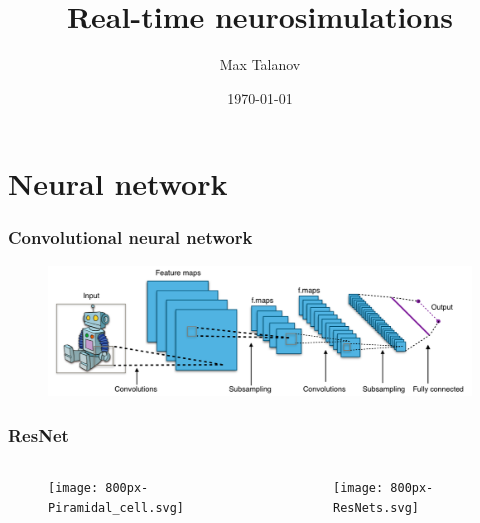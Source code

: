 \documentclass[12pt, aspectratio=169]{beamer}
\title[Real-time neurosimulations]{Real-time neurosimulations} %
\author[Max Talanov]{
  Max Talanov
}
\institute[B-Rain Labs LLC, NcN laboratory: ITIS : KFU]%
{
B-Rain Labs LLC, Neuromorphic computing and Neurosimulations laboratory, ITIS, KFU \\ %
\medskip
\textit{max.talanov@gmail.com} %
}
\date{\today} %
\begin{document}
\begin{frame}
\titlepage %
\end{frame}



\section{Neural network}

\begin{frame}
  \frametitle{Convolutional neural network}
  \begin{figure}
    \includegraphics[width=0.9\linewidth]{Typical_cnn}
  \end{figure}
\end{frame}



\begin{frame}
  \frametitle{ResNet}
  \begin{columns}
    \begin{column}{0.45\textwidth}
      \begin{figure}
        \texttt{[image: 800px-Piramidal\_cell.svg]}
      \end{figure}
    \end{column}
    \begin{column}{0.55\textwidth}
      \texttt{[image: 800px-ResNets.svg]}
    \end{column}
  \end{columns}
\end{frame}


\end{document}
